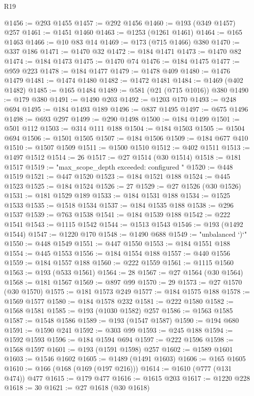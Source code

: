 \begin{lexlean}{R19}
\begin{coremodule}
@1456 := @293 @1455
@1457 := @292 @1456
@1460 := @193 (@349 @1457) @257
@1461 := @1451 @1460
@1463 := @1253 (@1261 @1461)
@1464 := @165 @1463
@1466 := @10 @83 @14
@1469 := @173 (@715 @1466) @380
@1470 := @337 @186
@1471 := @1470 @32
@1472 := @184 @1471
@1473 := @1470 @82
@1474 := @184 @1473
@1475 := @1470 @74
@1476 := @184 @1475
@1477 := @959 @223
@1478 := @184 @1477
@1479 := @1478 @409
@1480 := @1476 @1479
@1481 := @1474 @1480
@1482 := @1472 @1481
@1484 := @1469 (@402 @1482)
@1485 := @165 @1484
@1489 := @581 (@21 (@715 @1016)) @380
@1490 := @179 @380
@1491 := @1490 @203
@1492 := @1203 @170
@1493 := @248 @694
@1495 := @184 @1493 @189
@1496 := @837 @1495
@1497 := @675 @1496
@1498 := @693 @297
@1499 := @290 @1498
@1500 := @184 @1499
@1501 := @501 @112
@1503 := @314 @111 @188
@1504 := @184 @1503
@1505 := @1504 @694
@1506 := @1501 @1505
@1507 := @184 @1506
@1509 := @184 @677 @410
@1510 := @1507 @1509
@1511 := @1500 @1510
@1512 := @402 @1511
@1513 := @1497 @1512
@1514 := 26
@1517 := @27 @1514 (@30 @1514)
@1518 := @181 @1517
@1519 := "max_scope_depth exceeded: configured "
@1520 := @448 @1519
@1521 := @447 @1520
@1523 := @184 @1521 @188
@1524 := @445 @1523
@1525 := @184 @1524
@1526 := 27
@1529 := @27 @1526 (@30 @1526)
@1531 := @181 @1529 @189
@1533 := @184 @1531 @188
@1534 := @1525 @1533
@1535 := @1518 @1534
@1537 := @184 @1535 @188
@1538 := @296 @1537
@1539 := @763 @1538
@1541 := @184 @1539 @188
@1542 := @222 @1541
@1543 := @1115 @1542
@1544 := @1513 @1543
@1546 := @193 (@1492 @1544)
@1547 := @1220 @170
@1548 := @1490 @688
@1549 := "unbalanced `)`"
@1550 := @448 @1549
@1551 := @447 @1550
@1553 := @184 @1551 @188
@1554 := @445 @1553
@1556 := @184 @1554 @188
@1557 := @440 @1556
@1559 := @184 @1557 @188
@1560 := @222 @1559
@1561 := @1115 @1560
@1563 := @193 (@533 @1561)
@1564 := 28
@1567 := @27 @1564 (@30 @1564)
@1568 := @181 @1567
@1569 := @897 @99
@1570 := 29
@1573 := @27 @1570 (@30 @1570)
@1575 := @181 @1573 @249
@1577 := @184 @1575 @188
@1578 := @1569 @1577
@1580 := @184 @1578 @232
@1581 := @222 @1580
@1582 := @1568 @1581
@1585 := @193 (@1030 @1582) @257
@1586 := @1563 @1585
@1587 := @1548 @1586
@1589 := @193 (@1547 @1587)
@1590 := @194 @680
@1591 := @1590 @241
@1592 := @303 @99
@1593 := @245 @188
@1594 := @1592 @1593
@1596 := @184 @1594 @694
@1597 := @222 @1596
@1598 := @1568 @1597
@1601 := @193 (@1591 @1598) @257
@1602 := @1589 @1601
@1603 := @1546 @1602
@1605 := @1489 (@1491 @1603)
@1606 := @165 @1605
@1610 := @166 (@168 (@169 (@197 @216)))
@1614 := @1610 (@777 (@131 @474)) @477
@1615 := @179 @477
@1616 := @1615 @203
@1617 := @1220 @228
@1618 := 30
@1621 := @27 @1618 (@30 @1618)

\end{coremodule}
\end{lexlean}
